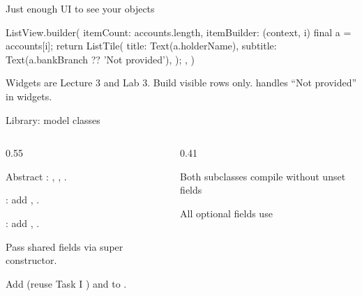\documentclass[10pt,aspectratio=169,t]{beamer}
\begin{document}
\begin{frame}[fragile,eyebrow=Scaffolding]{Just enough UI to see your objects}
\begin{dart}
ListView.builder(
  itemCount: accounts.length,
  itemBuilder: (context, i) {
    final a = accounts[i];
    return ListTile(
      title: Text(a.holderName),
      subtitle: Text(a.bankBranch ?? 'Not provided'),
    );
  },
)
\end{dart}
  \begin{takeaway}{Widgets are Lecture 3 and Lab 3.}
    Build visible rows only.  handles ``Not provided'' in widgets.
  \end{takeaway}
\end{frame}

\begin{frame}[eyebrow=Task III]{Library: model classes}
  {\small
  \begin{columns}[T]
    \begin{column}{0.55\textwidth}
      \begin{steps}
        \item Abstract : , , .
        \item {}: add , .
        \item {}: add , .
        \item Pass shared fields via super constructor.
        \item Add  (reuse Task I ) and  to .
      \end{steps}
    \end{column}
    \begin{column}{0.41\textwidth}
      \begin{checklist}
        \item Both subclasses compile without unset fields
        \item All optional fields use 
      \end{checklist}
    \end{column}
  \end{columns}
  }
\end{frame}
\end{document}
